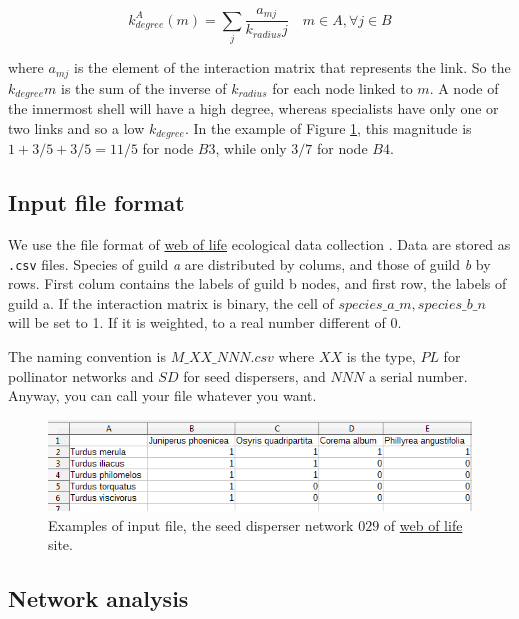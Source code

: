 \documentclass[12pt]{article}
\begin{document}
\begin{equation}
\displaystyle
k^A_{degree}(m) = \sum\limits_{j} \frac{a_{mj} }{k_{radius}j}  \quad   m \in A, \forall j \in B
\label{kdegree}
\end{equation}

\noindent where $a_{mj}$ is the element of the interaction matrix that represents the link. So the $k_{degree}m$ is the sum of the inverse of $k_{radius}$ for each node linked to $m$. A node of the innermost shell will have a high degree, whereas specialists have only one or two links and so a low $k_{degree}$. In the example of Figure \ref{fig:KMAN_red_example}, this magnitude is $1+3/5+3/5 = 11/5$ for node $B3$, while only $3/7$ for node $B4$. 

\subsection*{Input file format}
\label{input_file_format}

We use the file format of \href{http://www.web-of-life.es/}{web of life} ecological data collection \cite{bascompte2009}. Data are stored as \texttt{.csv} files. Species of guild \textit{a} are distributed by colums, and those of guild \textit{b} by rows. First colum contains the labels of guild b nodes, and first row, the labels of guild a. If the interaction matrix is binary, the cell of $species\_a\_m,species\_b\_n$ will be set to 1. If it is weighted, to a real number different of 0.

The naming convention is $M\_XX\_NNN.csv$ where $XX$ is the type, $PL$ for pollinator networks and $SD$ for seed dispersers, and $NNN$ a serial number. Anyway, you can call your file whatever you want.

\begin{figure}[h!]
\centering
\includegraphics[scale=0.8]{SD_029_csv.png}
\caption {Examples of input file, the seed disperser network $029$ of \href{http://www.web-of-life.es/}{web of life} site.}
\label{fig:KMAN_red_example}
\end{figure}

\subsection*{Network analysis}
\label{network_analysis}
\end{document}
